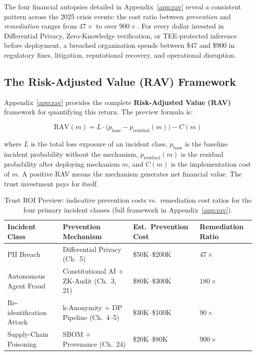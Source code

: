 The four financial autopsies detailed in Appendix~\ref{app:rav} reveal a consistent pattern across the 2025 crisis events: the cost ratio between \emph{prevention} and \emph{remediation} ranges from $47\times$ to over $900\times$. For every dollar invested in Differential Privacy, Zero-Knowledge verification, or TEE-protected inference before deployment, a breached organization spends between \$47 and \$900 in regulatory fines, litigation, reputational recovery, and operational disruption.

\subsection{The Risk-Adjusted Value (RAV) Framework}
\label{subsec:rav_preview}

Appendix~\ref{app:rav} provides the complete \textbf{Risk-Adjusted Value (RAV)} framework for quantifying this return. The preview formula is:

\begin{equation}
\text{RAV}(m) = L \cdot \bigl(p_{\text{base}} - p_{\text{residual}}(m)\bigr) - C(m)
\label{eq:rav_preview}
\end{equation}

\noindent where $L$ is the total loss exposure of an incident class, $p_{\text{base}}$ is the baseline incident probability without the mechanism, $p_{\text{residual}}(m)$ is the residual probability after deploying mechanism $m$, and $C(m)$ is the implementation cost of $m$. A positive RAV means the mechanism generates net financial value. The trust investment pays for itself.

\begin{table}[ht]
\centering
\caption{Trust ROI Preview: indicative prevention costs vs.\ remediation cost ratios for the four primary incident classes (full framework in Appendix~\ref{app:rav}).}
\label{tab:trust_roi}
\renewcommand{\arraystretch}{1.3}
\begin{tabular}{p{3.5cm} p{3.8cm} p{2.5cm} p{2.0cm}}
\toprule
\textbf{Incident Class} & \textbf{Prevention Mechanism} & \textbf{Est.\ Prevention Cost} & \textbf{Remediation Ratio} \\
\midrule
PII Breach & Differential Privacy (Ch.~5) & \$50K--\$200K & $47\times$ \\
Autonomous Agent Fraud & Constitutional AI + ZK-Audit (Ch.~3, 21) & \$80K--\$300K & $180\times$ \\
Re-identification Attack & k-Anonymity + DP Pipeline (Ch.~4--5) & \$30K--\$100K & $90\times$ \\
Supply-Chain Poisoning & SBOM + Provenance (Ch.~24) & \$20K--\$80K & $900\times$ \\
\bottomrule
\end{tabular}
\end{table}

